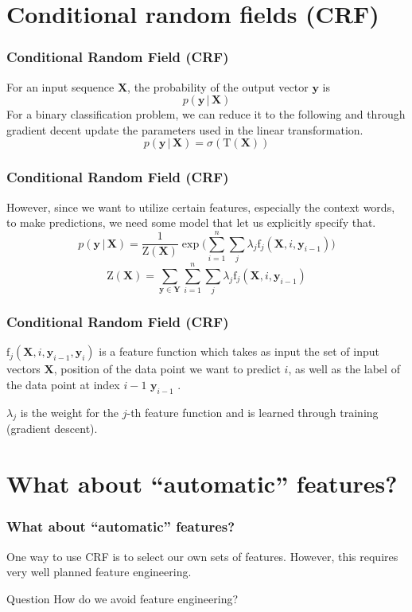 \documentclass{beamer}
\begin{document}
\section{Conditional random fields (CRF)}
\begin{frame}
    \frametitle{Conditional Random Field (CRF)}
    For an input sequence $\mathbf{X}$, the probability of the output vector $\mathbf{y}$ is
    \begin{equation}
        p(\mathbf{y}\, |\, \mathbf{X})
    \end{equation}
    For a binary classification problem, we can reduce it to the following and through gradient decent update the parameters used in the linear transformation.
    \begin{equation}
        p(\mathbf{y}\, |\, \mathbf{X}) = \sigma(\mathrm{T}(\mathbf{X}))
    \end{equation}
\end{frame}

\begin{frame}
    \frametitle{Conditional Random Field (CRF)}
    However, since we want to utilize certain features, especially the context words, to make predictions, we need some model that let us explicitly specify that. 
    \begin{equation}
        p(\mathbf{y}\, |\, \mathbf{X}) = \frac{1}{\mathrm{Z}(\mathbf{X})} \exp\Big(\sum^n_{i=1}\sum_j \lambda_j\mathrm{f}_j(\mathbf{X}, i, \mathbf{y}_{i-1})\Big)
    \end{equation}
    \begin{equation}
        \mathrm{Z}(\mathbf{X}) = \sum_{\mathbf{y} \in \mathbf{Y}}\sum^n_{i=1}\sum_j \lambda_j\mathrm{f}_j(\mathbf{X}, i, \mathbf{y}_{i-1})
    \end{equation}
\end{frame}

\begin{frame}
    \frametitle{Conditional Random Field (CRF)}
    $\mathrm{f}_j(\mathbf{X}, i, \mathbf{y}_{i-1}, \mathbf{y}_i)$ is a feature function which takes as input the set of input vectors $\mathbf{X}$, position of the data point we want to predict $i$, as well as the label of the data point at index $i - 1$ $\mathbf{y}_{i-1}$ .
    
    \vspace{10pt}    
    $\lambda_j$ is the weight for the $j$-th feature function and is learned through training (gradient descent).
\end{frame}

\section{What about ``automatic'' features?}
\begin{frame}
    \frametitle{What about ``automatic'' features?}
    One way to use CRF is to select our own sets of features. However, this requires very well planned feature engineering. 
    \begin{block}{Question}
        How do we avoid feature engineering? 
    \end{block}
\end{frame}
\end{document}
